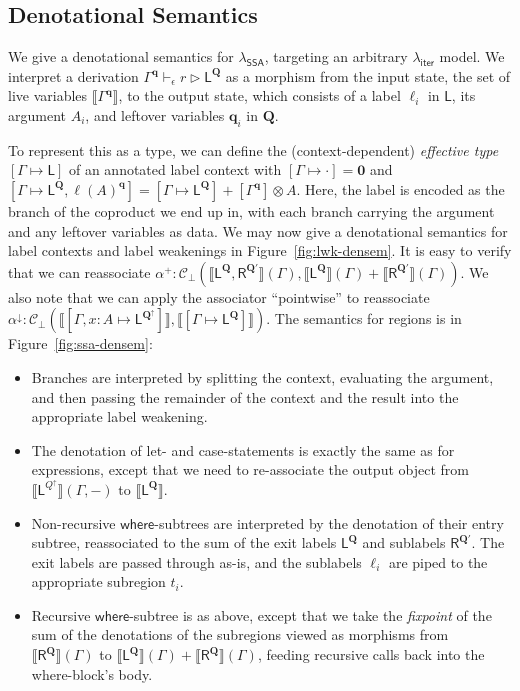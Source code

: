 \documentclass[acmsmall,screen,anonymous,review]{acmart}
\newcommand{\mc}[1]{\ensuremath{\mathcal{#1}}}
\newcommand{\mb}[1]{\ensuremath{\mathbf{#1}}}
\newcommand{\ms}[1]{\ensuremath{\mathsf{#1}}}
\newcommand{\haslb}[4]{#1 \vdash_{#2} #3 \rhd #4}
\newcommand{\etoty}[1]{[#1]}
\newcommand{\ltoty}[2]{[#1 \mapsto #2]}
\newcommand{\dnt}[1]{\llbracket{#1}\rrbracket}
\newcommand{\subiterexp}{\texorpdfstring{\(\lambda_{\ms{iter}}\)}{lambda-iter}}
\newcommand{\isotopessa}{\(\lambda_{\ms{SSA}}\)}
\newcommand{\zeroqv}[1]{#1^\uparrow}
\begin{document}
\subsection{Denotational Semantics}

We give a denotational semantics for \isotopessa{}, targeting an arbitrary
\subiterexp{} model. We interpret a derivation
$\haslb{\Gamma^{\mb{q}}}{\epsilon}{r}{\ms{L}^{\mb{Q}}}$ as a morphism from the input state, the set
of live variables $\dnt{\Gamma^{\mb{q}}}$, to the output state, which consists of a label $\ell_i$
in $\ms{L}$, its argument $A_i$, and leftover variables $\mb{q}_i$ in $\mb{Q}$. 

To represent this as a type, we can define the (context-dependent) \emph{effective type}
$\ltoty{\Gamma}{\ms{L}}$ of an annotated label context with $\ltoty{\Gamma}{\cdot} = \mb{0}$ and
$\ltoty{\Gamma}{\ms{L}^{\mb{Q}}, \ell(A)^{\mb{q}}} = \ltoty{\Gamma}{\ms{L}^{\mb{Q}}} +
\etoty{\Gamma^{\mb{q}}} \otimes A$.    
Here, the label is encoded as the branch of the coproduct we end up in, with each branch carrying
the argument and any leftover variables as data. We may now give a denotational semantics for label 
contexts and label weakenings in Figure~\ref{fig:lwk-densem}. 
It is easy to verify that we can reassociate 
$
\alpha^+ : \mc{C}_\bot(
  \dnt{\ms{L}^{\mb{Q}}, \ms{R}^{\mb{Q}'}}(\Gamma),
  \dnt{\ms{L}^{\mb{Q}}}(\Gamma) + \dnt{\ms{R}^{\mb{Q}'}}(\Gamma)
)
$.
We also note that we can apply the 
associator ``pointwise'' to reassociate
$\alpha^\downarrow: \mc{C}_\bot(
  \dnt{\ltoty{\Gamma, x : A}{\ms{L}^{\zeroqv{\mb{Q}}}}}, 
  \dnt{\ltoty{\Gamma}{\ms{L}^{\mb{Q}}}}
)$. 
%
The semantics for regions is in Figure~\ref{fig:ssa-densem}:
\begin{itemize}
  \item Branches are interpreted by splitting the context, evaluating the argument,
  and then passing the remainder of the context and the result into the appropriate
  label weakening.
  \item The denotation of let- and case-statements is exactly the same as for expressions,
  except that we need to re-associate the output object from 
  $\dnt{\ms{L}^{\zeroqv{Q}}}(\Gamma, -)$ to $\dnt{\ms{L}^{\mb{Q}}}$.
  \item Non-recursive \ms{where}-subtrees are interpreted by the denotation of their entry subtree,
  reassociated to the sum of the exit labels $\ms{L}^{\mb{Q}}$ and sublabels $\ms{R}^{\mb{Q}'}$. The
  exit labels are passed through as-is, and the sublabels $\ell_i$ are piped to the appropriate
  subregion $t_i$.
  \item Recursive \ms{where}-subtree is as above, except that we take the \emph{fixpoint} of the sum
  of the denotations of the subregions viewed as morphisms from $\dnt{\ms{R}^{\mb{Q}}}(\Gamma)$
  to $\dnt{\ms{L}^{\mb{Q}}}(\Gamma) + \dnt{\ms{R}^{\mb{Q}}}(\Gamma)$, feeding recursive
  calls back into the  where-block's body.
\end{itemize}
\end{document}
